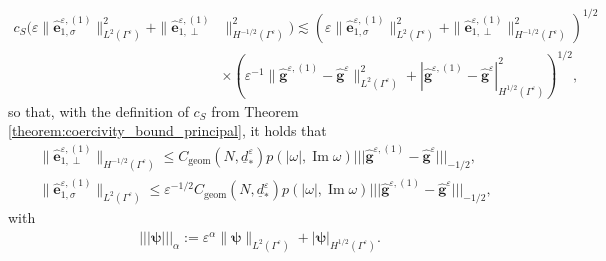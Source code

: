 \documentclass[]{article}
\numberwithin{equation}{section}
\numberwithin{theorem}{section}
\numberwithin{lemma}{section}
\numberwithin{corollary}{section}
\numberwithin{proposition}{section}
\numberwithin{definition}{section}
\newcommand{\re}{\varepsilon}
\renewcommand{\vec}{\boldsymbol}
\renewcommand{\Im}{\operatorname{Im}}
\newcommand{\trinorm}[1]{\vert\!\vert\!\vert #1 \vert\!\vert\!\vert}
\begin{document}
	\begin{align*}%
		c_S(\varepsilon\|\hat{\vec{e}}^{\re,(1)}_{1,\sigma}\|^2_{L^2(\Gamma^{\re})}+\| \hat{\vec{e}}^{\re,(1)}_{1,\perp}
		&\|^2_{H^{-1/2}(\Gamma^{\re})})
		\lesssim
		(\varepsilon\|\hat{\vec{e}}^{\re,(1)}_{1,\sigma}\|^2_{L^2(\Gamma^{\re})}+\|\hat{\vec{e}}^{\re,(1)}_{1,\perp}\|^2_{H^{-1/2}(\Gamma^{\re})})^{1/2} \\
		&\times (\varepsilon^{-1}\|\hat{\vec{g}}^{\re,(1)}-\hat{\vec{g}}^{\re}\|_{L^2(\Gamma^{\re})}^2+|\hat{\vec{g}}^{\re,(1)}-\hat{\vec{g}}^{\re}|^2_{H^{1/2}(\Gamma^{\re})})^{1/2},
	\end{align*}
	so that, with the definition of $c_S$ from Theorem \ref{theorem:coercivity_bound_principal}, it holds that
	\begin{align}
		\label{eq:QperpE}
		&\| \hat{\vec{e}}^{\re,(1)}_{1, \perp}\|_{H^{-1/2}(\Gamma^{\re})}
		\leq C_{\operatorname{geom}}(N, \underline{d}_*^{\re})p(|\omega|,\Im\omega) \trinorm{\hat{\vec{g}}^{\re,(1)}-\hat{\vec{g}}^{\re}}_{-1/2}, \\
		\label{eq:ere1}
		&\| \hat{\vec{e}}^{\re,(1)}_{1, \sigma}\|_{L^2(\Gamma^{\re})} \leq \varepsilon^{-1/2}C_{\operatorname{geom}}(N, \underline{d}_*^{\re})p(|\omega|,\Im\omega)\trinorm{\hat{\vec{g}}^{\re,(1)}-\hat{\vec{g}}^{\re}}_{-1/2},
	\end{align}
	with \begin{align}
		\label{eq:trinorm}
		\trinorm{ \vec{\psi} }_{\alpha} := \re^{\alpha} \| \vec{\psi} \|_{L^2(\Gamma^{\re})} + | \vec{\psi} |_{H^{1/2}(\Gamma^{\re})}.
	\end{align}
\end{document}

